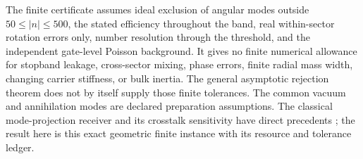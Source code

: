 \documentclass[aps,pra,reprint,superscriptaddress,longbibliography]{revtex4-2}
\begin{document}
The finite certificate assumes ideal exclusion of angular modes
outside $50\le|n|\le500$, the stated efficiency throughout the band,
real within-sector rotation errors only, number resolution through
the threshold, and the independent gate-level Poisson background.
It gives no finite numerical allowance for stopband leakage,
cross-sector mixing, phase errors, finite radial mass width, changing
carrier stiffness, or bulk inertia. The general asymptotic rejection
theorem does not by itself supply those finite tolerances.
The common vacuum and annihilation modes are declared preparation
assumptions. The classical mode-projection receiver and its
crosstalk sensitivity have direct precedents
\cite{Lu2018,Schlichtholz2024}; the result here is this exact
geometric finite instance with its resource and tolerance ledger.

\end{document}
